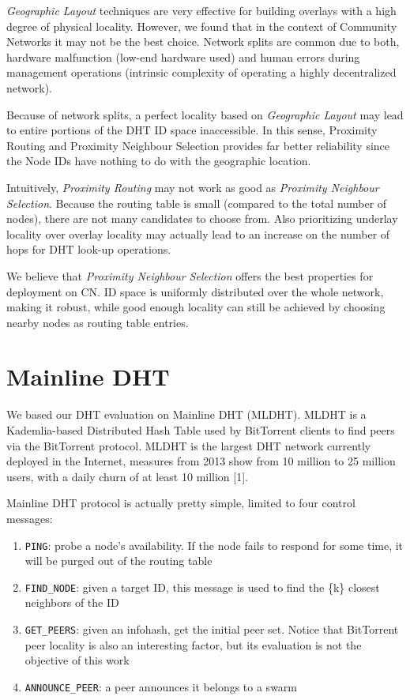 \documentclass[conference]{IEEEtran}
\begin{document}
\textit{Geographic Layout} techniques are very effective for building overlays with a high degree of physical locality. However, we found that in the context of Community Networks it may not be the best choice. Network splits are common due to both, hardware malfunction (low-end hardware used) and human errors during management operations (intrinsic complexity of operating a highly decentralized network).

Because of network splits, a perfect locality based on \textit{Geographic Layout} may lead to entire portions of the DHT ID space inaccessible. In this sense, Proximity Routing and Proximity Neighbour Selection provides far better reliability since the Node IDs have nothing to do with the geographic location. 

Intuitively, \textit{Proximity Routing} may not work as good as \textit{Proximity Neighbour Selection}. Because the routing table is small (compared to the total number of nodes), there are not many candidates to choose from. Also prioritizing underlay locality over overlay locality may actually lead to an increase on the number of hops for DHT look-up operations.

We believe that \textit{Proximity Neighbour Selection} offers the best properties for deployment on CN. ID space is uniformly distributed over the whole network, making it robust, while good enough locality can still be achieved by choosing nearby nodes as routing table entries.

\section{Mainline DHT}

We based our DHT evaluation on Mainline DHT (MLDHT). MLDHT is a Kademlia-based Distributed Hash Table used by BitTorrent clients to find peers via the BitTorrent protocol. MLDHT is the largest DHT network currently deployed in the Internet, measures from 2013 show from 10 million to 25 million users, with a daily churn of at least 10 million [1].

Mainline DHT protocol is actually pretty simple, limited to four control messages:

\begin{enumerate}
\item \texttt{PING}: probe a node's availability. If the node fails to respond for some time, it will be purged out of the routing table
\item \texttt{FIND\_NODE}: given a target ID, this message is used to find the \{k\} closest neighbors of the ID
\item \texttt{GET\_PEERS}: given an infohash, get the initial peer set. Notice that BitTorrent peer locality is also an interesting factor, but its evaluation is not the objective of this work
\item \texttt{ANNOUNCE\_PEER}: a peer announces it belongs to a swarm
\end{enumerate}
\end{document}
